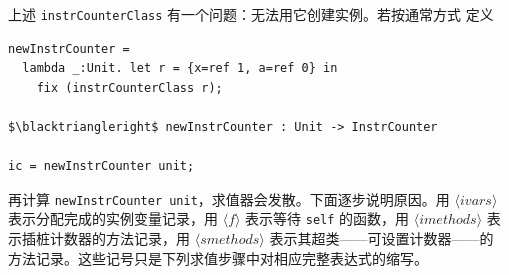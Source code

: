 上述 \texttt{instrCounterClass} 有一个问题：无法用它创建实例。若按通常方式
定义

\begin{lstlisting}[mathescape=true]
newInstrCounter =
  lambda _:Unit. let r = {x=ref 1, a=ref 0} in
    fix (instrCounterClass r);

$\blacktriangleright$ newInstrCounter : Unit -> InstrCounter

ic = newInstrCounter unit;
\end{lstlisting}

再计算 \texttt{newInstrCounter unit}，求值器会发散。下面逐步说明原因。用
\(\langle\mathit{ivars}\rangle\) 表示分配完成的实例变量记录，用
\(\langle f\rangle\) 表示等待 \texttt{self} 的函数，用
\(\langle\mathit{imethods}\rangle\) 表示插桩计数器的方法记录，用
\(\langle\mathit{smethods}\rangle\) 表示其超类——可设置计数器——的
方法记录。这些记号只是下列求值步骤中对相应完整表达式的缩写。

